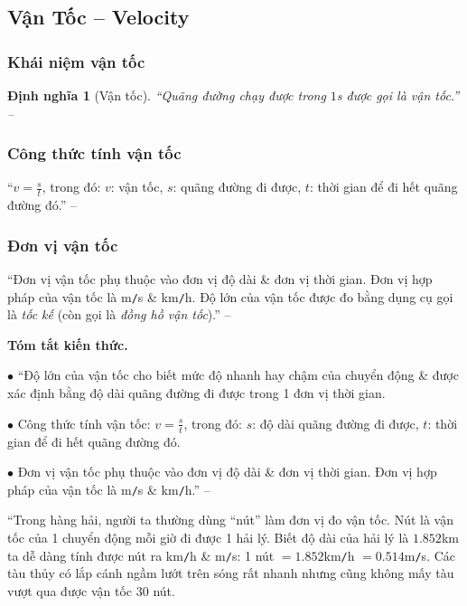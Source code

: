 \documentclass{article}
\numberwithin{equation}{section}
\newtheorem{dinhnghia}{Định nghĩa}[section]
\begin{document}
\subsection{Vận Tốc -- Velocity}

\subsubsection{Khái niệm vận tốc}

\begin{dinhnghia}[Vận tốc]
	``Quãng đường chạy được trong $1$s được gọi là \emph{vận tốc}.'' -- \cite[p. 8]{SGK_Vat_Ly_8}
\end{dinhnghia}

\subsubsection{Công thức tính vận tốc}
``$v = \frac{s}{t}$, trong đó: $v$: vận tốc, $s$: quãng đường đi được, $t$: thời gian để đi hết quãng đường đó.'' -- \cite[p. 9]{SGK_Vat_Ly_8}

\subsubsection{Đơn vị vận tốc}
``Đơn vị vận tốc phụ thuộc vào đơn vị độ dài \& đơn vị thời gian. Đơn vị hợp pháp của vận tốc là m\texttt{/}s \& km\texttt{/}h. Độ lớn của vận tốc được đo bằng dụng cụ gọi là \textit{tốc kế} (còn gọi là \textit{đồng hồ vận tốc}).'' -- \cite[p. 9]{SGK_Vat_Ly_8}
\vspace{2mm}

\noindent\textbf{Tóm tắt kiến thức.}
\begin{enumerate*}
	\item[$\bullet$] ``Độ lớn của vận tốc cho biết mức độ nhanh hay chậm của chuyển động \& được xác định bằng độ dài quãng đường đi được trong 1 đơn vị thời gian.
	\item[$\bullet$] Công thức tính vận tốc: $v = \frac{s}{t}$, trong đó: $s$: độ dài quãng đường đi được, $t$: thời gian để đi hết quãng đường đó.
	\item[$\bullet$] Đơn vị vận tốc phụ thuộc vào đơn vị độ dài \& đơn vị thời gian. Đơn vị hợp pháp của vận tốc là m\texttt{/}s \& km\texttt{/}h.'' -- \cite[p. 10]{SGK_Vat_Ly_8}
\end{enumerate*}

``Trong hàng hải, người ta thường dùng ``nút'' làm đơn vị đo vận tốc. Nút là vận tốc của 1 chuyển động mỗi giờ đi được 1 hải lý. Biết độ dài của hải lý là $1.852$km ta dễ dàng tính được nút ra km\texttt{/}h \& m\texttt{/}s: 1 nút $= 1.852$km\texttt{/}h $= 0.514$m\texttt{/}s. Các tàu thủy có lắp cánh ngầm lướt trên sóng rất nhanh nhưng cũng không mấy tàu vượt qua được vận tốc $30$ nút.
\end{document}
